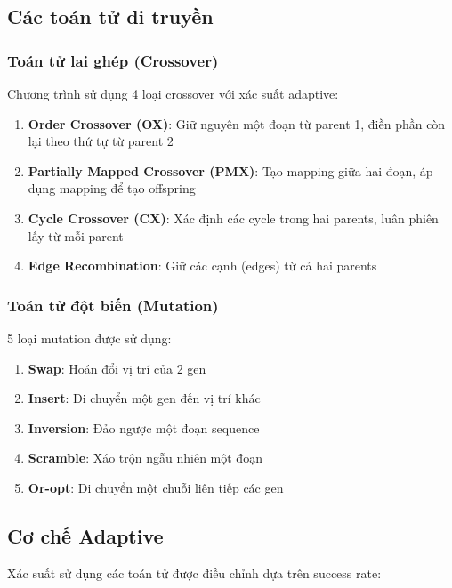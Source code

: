 \documentclass[12pt,a4paper]{article}
\begin{document}
\subsection{Các toán tử di truyền}

\subsubsection{Toán tử lai ghép (Crossover)}

Chương trình sử dụng 4 loại crossover với xác suất adaptive:

\begin{enumerate}
    \item \textbf{Order Crossover (OX)}: Giữ nguyên một đoạn từ parent 1, điền phần còn lại theo thứ tự từ parent 2
    \item \textbf{Partially Mapped Crossover (PMX)}: Tạo mapping giữa hai đoạn, áp dụng mapping để tạo offspring
    \item \textbf{Cycle Crossover (CX)}: Xác định các cycle trong hai parents, luân phiên lấy từ mỗi parent
    \item \textbf{Edge Recombination}: Giữ các cạnh (edges) từ cả hai parents
\end{enumerate}

\subsubsection{Toán tử đột biến (Mutation)}

5 loại mutation được sử dụng:

\begin{enumerate}
    \item \textbf{Swap}: Hoán đổi vị trí của 2 gen
    \item \textbf{Insert}: Di chuyển một gen đến vị trí khác
    \item \textbf{Inversion}: Đảo ngược một đoạn sequence
    \item \textbf{Scramble}: Xáo trộn ngẫu nhiên một đoạn
    \item \textbf{Or-opt}: Di chuyển một chuỗi liên tiếp các gen
\end{enumerate}

\subsection{Cơ chế Adaptive}

Xác suất sử dụng các toán tử được điều chỉnh dựa trên success rate:
\end{document}
